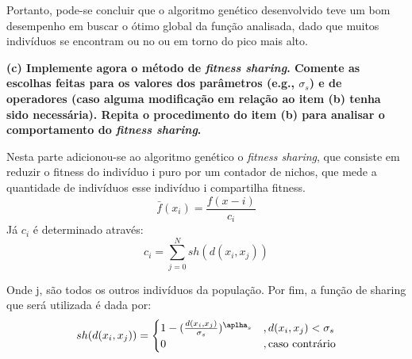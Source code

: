 \documentclass[a4paper, 12pt]{article}
\newcommand{\fitsha}{\textit{fitness sharing}\xspace}
\begin{document}
Portanto, pode-se concluir que o algoritmo genético desenvolvido teve um bom desempenho em buscar o ótimo global da função analisada, dado que muitos indivíduos se encontram ou no ou em torno do pico mais alto.

\textbf{(c) Implemente agora o método de \fitsha. Comente as escolhas feitas para os valores dos parâmetros (e.g., $\sigma_s$) e de operadores (caso alguma modificação em relação ao item (b) tenha sido necessária). Repita o procedimento do item (b) para analisar o comportamento do \fitsha.}

Nesta parte adicionou-se ao algoritmo genético o \fitsha, que consiste em 
reduzir o fitness do indivíduo i puro por um contador de nichos, que mede a quantidade de indivíduos esse indivíduo i compartilha fitness.
$$\bar{f}(x_i) = \frac{f(x-i)}{c_i}$$
Já $c_i$ é determinado através:
$$c_i = \sum_{j = 0}^{N} sh(d(x_i,x_j))$$

Onde j, são todos os outros indivíduos da população. Por fim, a função de sharing que será utilizada é dada por:
$$sh(d(x_i,x_j)) = \begin{cases}
    1 - (\frac{d(x_i,x_j)}{\sigma_s})^{\aplha_s} &, d(x_i,x_j) < \sigma_s \\
    0 & , \text{caso contrário}
\end{cases}$$
\end{document}
